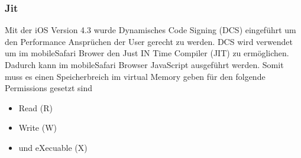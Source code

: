 
\subsubsection{Jit}
\label{sec:Jit}

Mit der iOS Version 4.3 wurde Dynamisches Code Signing (DCS) eingeführt um den Performance Ansprüchen der User gerecht zu werden. DCS wird verwendet um im mobileSafari Brower den Just IN Time Compiler (JIT) zu ermöglichen. Dadurch kann im mobileSafari Browser JavaScript ausgeführt werden. Somit muss es einen Speicherbreich im virtual Memory geben für den folgende Permissions gesetzt sind

\begin{itemize}
    \item Read (R)
    \item Write (W)
    \item und eXecuable (X)
\end{itemize}
    
